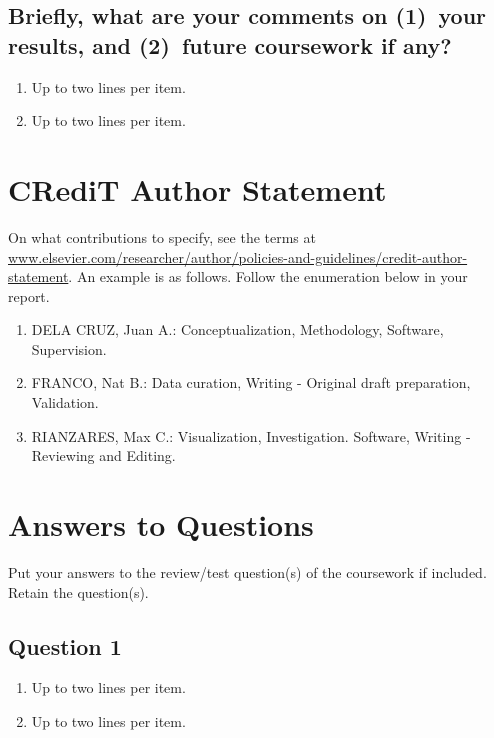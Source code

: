 \subsection{Briefly, what are your comments on (1)~your results, and  (2)~future coursework if any?}
\begin{enumerate}
\item Up to two lines per item.
\item Up to two lines per item.
\end{enumerate}	



\section{CRediT Author Statement}

On what contributions to specify, see the terms at \url{www.elsevier.com/researcher/author/policies-and-guidelines/credit-author-statement}.  An example is as follows.  Follow the enumeration below in your report.

\begin{enumerate}
	\item DELA CRUZ, Juan A.: Conceptualization, Methodology, Software, Supervision.
	
	\item FRANCO, Nat B.: Data curation, Writing - Original draft preparation, Validation.
	
	\item RIANZARES, Max C.: Visualization, Investigation. Software, Writing - Reviewing and Editing.
\end{enumerate}














\section{Answers to Questions}
\label{sec:ans2ques}

Put your answers to the review/test question(s) of the coursework if included.  Retain the question(s). 

\subsection{Question 1}  
\begin{enumerate}
\item Up to two lines per item.
\item Up to two lines per item.
\end{enumerate}	
	
